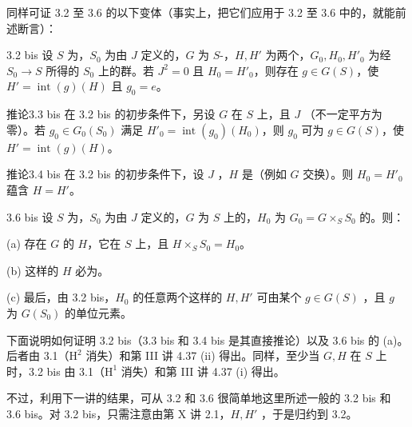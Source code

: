 同样可证 3.2 至 3.6 的以下变体（事实上，把它们应用于 3.2 至 3.6 中的，就能前述断言）：
\begin{SGAresult}{}{3.2 bis}
设 $S$ 为，$S_0$ 为由 $J$ 定义的，$G$ 为 $S$-，$H,H'$ 为两个，$G_0,H_0,H'_0$ 为经 $S_0\to S$ 所得的 $S_0$ 上的群。若 $J^2=0$ 且 $H_0=H'_0$，则存在 $g\in G(S)$，使 $H'=\operatorname{int}(g)(H)$ 且 $g_0=e$。
\end{SGAresult}
\begin{SGAresult}{推论}{3.3 bis}
在 3.2 bis 的初步条件下，另设 $G$ 在 $S$ 上，且 $J$ （不一定平方为零）。若 $g_0\in G_0(S_0)$ 满足 $H'_0=\operatorname{int}(g_0)(H_0)$，则 $g_0$ 可为 $g\in G(S)$，使 $H'=\operatorname{int}(g)(H)$。
\end{SGAresult}
\begin{SGAresult}{推论}{3.4 bis}
在 3.2 bis 的初步条件下，设 $J$ ，$H$ 是（例如 $G$ 交换）。则 $H_0=H'_0$ 蕴含 $H=H'$。
\end{SGAresult}
\begin{SGAresult}{}{3.6 bis}
设 $S$ 为，$S_0$ 为由 $J$ 定义的，$G$ 为 $S$ 上的，$H_0$ 为 $G_0=G\times_S S_0$ 的。则：

 (a) 存在 $G$ 的 $H$，它在 $S$ 上，且 $H\times_S S_0=H_0$。

 (b) 这样的 $H$ 必为。

 (c) 最后，由 3.2 bis，$H_0$ 的任意两个这样的 $H,H'$ 可由某个 $g\in G(S)$ ，且 $g$ 为 $G(S_0)$ 的单位元素。
\end{SGAresult}
下面说明如何证明 3.2 bis（3.3 bis 和 3.4 bis 是其直接推论）以及 3.6 bis 的 (a)。后者由 3.1（$\mathrm H^2$ 消失）和第 III 讲 4.37 (ii) 得出。同样，至少当 $G,H$ 在 $S$ 上时，3.2 bis 由 3.1（$\mathrm H^1$ 消失）和第 III 讲 4.37 (i) 得出。

不过，利用下一讲的结果，可从 3.2 和 3.6 很简单地这里所述一般的 3.2 bis 和 3.6 bis。对 3.2 bis，只需注意由第 X 讲 2.1，$H,H'$ ，于是归约到 3.2。

